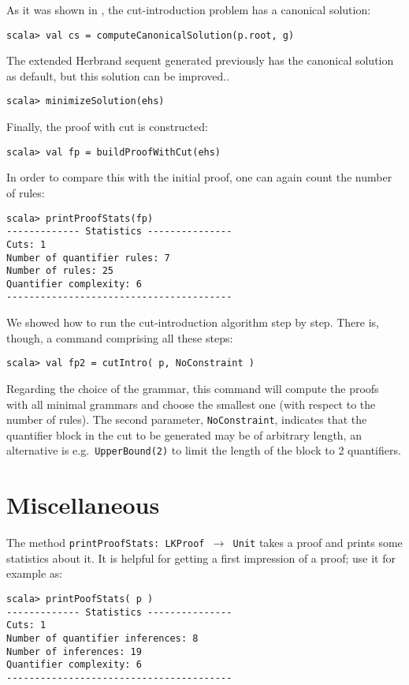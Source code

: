 \documentclass[a4paper,11pt]{article}
\begin{document}
As it was shown in \cite{HetzlXXAlgorithmic}, the cut-introduction problem has a
canonical solution:
\begin{lstlisting}
scala> val cs = computeCanonicalSolution(p.root, g)
\end{lstlisting}
The extended Herbrand sequent generated previously has the canonical solution as
default, but this solution can be improved.. 
\begin{lstlisting}
scala> minimizeSolution(ehs)
\end{lstlisting}
Finally, the proof with cut is constructed:
\begin{lstlisting}
scala> val fp = buildProofWithCut(ehs)
\end{lstlisting}
In order to compare this with the initial proof, one can again count
the number of rules:
\begin{lstlisting}
scala> printProofStats(fp)
------------- Statistics ---------------
Cuts: 1
Number of quantifier rules: 7
Number of rules: 25
Quantifier complexity: 6
----------------------------------------
\end{lstlisting}
We showed how to run the cut-introduction algorithm step by step. There is,
though, a command comprising all these steps:
\begin{lstlisting}
scala> val fp2 = cutIntro( p, NoConstraint )
\end{lstlisting}
Regarding the choice of the grammar, this command will compute the proofs with
all minimal grammars and choose the smallest one (with respect to the number of rules).
The second parameter, \texttt{NoConstraint}, indicates that the quantifier
block in the cut to be generated may be of arbitrary length, an alternative is
e.g.~\texttt{UpperBound(2)} to limit the length of the block to 2 quantifiers.

\section{Miscellaneous}

The method \texttt{printProofStats: LKProof $\rightarrow$ Unit}
takes a proof and prints some statistics about it. It is helpful
for getting a first impression of a proof; use it for example as:

\begin{lstlisting}
scala> printPoofStats( p )
------------- Statistics ---------------
Cuts: 1
Number of quantifier inferences: 8
Number of inferences: 19
Quantifier complexity: 6
----------------------------------------
\end{lstlisting}
\end{document}
